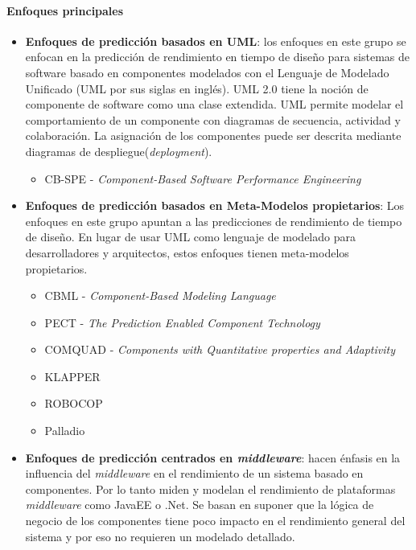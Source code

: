 \paragraph{Enfoques principales}
\begin{itemize}
    \item \textbf{Enfoques de predicción basados en UML}: los enfoques en este grupo se enfocan en la predicción de rendimiento en tiempo de diseño para sistemas de software basado en componentes modelados con el Lenguaje de Modelado Unificado (UML por sus siglas en inglés). UML 2.0 tiene la noción de componente de software como una clase extendida. UML permite modelar el comportamiento de un componente con diagramas de secuencia, actividad y colaboración. La asignación de los componentes puede ser descrita mediante diagramas de despliegue(\emph{deployment}).     
    \begin{itemize}
        \item CB-SPE - \emph{Component-Based Software Performance Engineering} 
    \end{itemize}
    \item \textbf{Enfoques de predicción basados en Meta-Modelos propietarios}: Los enfoques en este grupo apuntan a las predicciones de rendimiento de tiempo de diseño. En lugar de usar UML como lenguaje de modelado para desarrolladores y arquitectos, estos enfoques tienen meta-modelos propietarios\cite{Koziolek:2010:PEC:1808359.1808729}.
    \begin{itemize}
        \item CBML - \emph{Component-Based Modeling Language}
        \item PECT - \emph{The Prediction Enabled Component Technology}
        \item COMQUAD - \emph{Components with Quantitative properties and Adaptivity}
        \item KLAPPER
        \item ROBOCOP
        \item Palladio        
    \end{itemize}
    \item \textbf{Enfoques de predicción centrados en \emph{middleware}}: hacen énfasis en la influencia del \emph{middleware} en el rendimiento de un sistema basado en componentes. Por lo tanto miden y modelan el rendimiento de plataformas \emph{middleware} como JavaEE o .Net. Se basan en suponer que la lógica de negocio de los componentes tiene poco impacto en el rendimiento general del sistema y por eso no requieren un modelado detallado.

\end{itemize}
